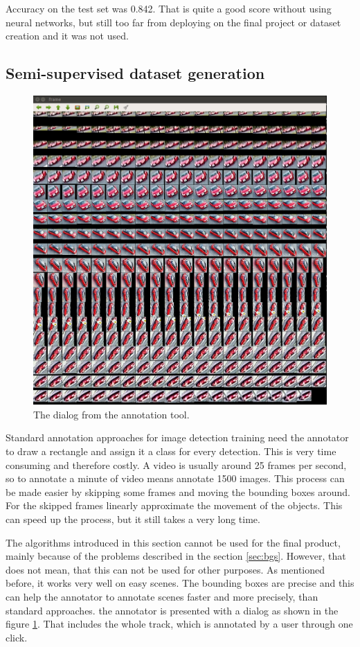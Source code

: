 \documentclass[a4paper,11pt,titlepage,twoside]{article}
\numberwithin{figure}{section}
\begin{document}
Accuracy on the test set was 0.842. That is quite a good score without using neural networks, but still too far from deploying on the final project or dataset creation and it was not used.

\subsection{Semi-supervised dataset generation} 
\label{sec:data-generation}

\begin{figure}[h!]
\centering
\includegraphics[width=0.5\linewidth]{fig/omni_labeling.png}
\caption{The dialog from the annotation tool.}
\label{fig:labeling}
\end{figure}

Standard annotation approaches for image detection training need the annotator to draw a rectangle and assign it a class for every detection. This is very time consuming and therefore costly. A video is usually around 25 frames per second, so to annotate a minute of video means annotate 1500 images. This process can be made easier by skipping some frames and moving the bounding boxes around. For the skipped frames linearly approximate the movement of the objects. This can speed up the process, but it still takes a very long time. 


The algorithms introduced in this section cannot be used for the final product, mainly because of the problems described in the section \ref{sec:bgs}. However, that does not mean, that this can not be used for other purposes. As mentioned before, it works very well on easy scenes. The bounding boxes are precise and this can help the annotator to annotate scenes faster and more precisely, than standard approaches. the annotator is presented with a dialog as shown in the figure \ref{fig:labeling}. That includes the whole track, which is annotated by a user through one click. 
\end{document}
